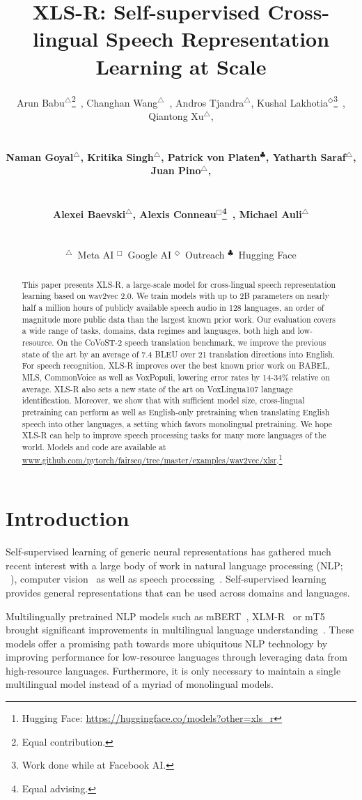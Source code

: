 \documentclass{article} \usepackage{iclr2022_conference,times}
\title{XLS-R: Self-supervised Cross-lingual Speech Representation Learning at Scale}
\author{\centerline{
Arun Babu$^{\bigtriangleup}$\thanks{Equal contribution.}~, 
Changhan Wang$^{\bigtriangleup}$\samethanks~,
Andros Tjandra$^{\bigtriangleup}$, 
Kushal Lakhotia$^{\Diamond}$\thanks{Work done while at Facebook AI.}~, 
Qiantong Xu$^{\bigtriangleup}$,} \vspace{1mm}\\
\centerline{\textbf{
Naman Goyal$^{\bigtriangleup}$,
Kritika Singh$^{\bigtriangleup}$, 
Patrick von Platen$^{\clubsuit}$, 
Yatharth Saraf$^{\bigtriangleup}$,
Juan Pino$^{\bigtriangleup}$,}}\vspace{1mm}\\
\centerline{\textbf{
Alexei Baevski$^{\bigtriangleup}$, 
Alexis Conneau$^{\Box}$\thanks{Equal advising.}~,
Michael Auli$^{\bigtriangleup}$\samethanks}}\vspace{1mm}\\
\centerline{\normalfont $^{\bigtriangleup}$~Meta AI\hspace{0.2in}
$^{\Box}$~Google AI\hspace{0.2in}
$^{\Diamond}$~Outreach\hspace{0.2in}
$^{\clubsuit}$~Hugging Face}
}
\newcommand{\xlsrp}{XLS-R}
\begin{document}
\maketitle

\begin{abstract}
This paper presents \xlsrp{}, a large-scale model for cross-lingual speech representation learning based on wav2vec 2.0. 
We train models with up to 2B parameters on nearly half a million hours of publicly available speech audio in 128 languages, an order of magnitude more public data than the largest known prior work.
Our evaluation covers a wide range of tasks, domains, data regimes and languages, both high and low-resource. 
On the CoVoST-2 speech translation benchmark, we improve the previous state of the art by an average of 7.4 BLEU over 21 translation directions into English.
For speech recognition, \xlsrp{} improves over the best known prior work on BABEL, MLS, CommonVoice as well as VoxPopuli, lowering error rates by 14-34\% relative on average.
\xlsrp{} also sets a new state of the art on VoxLingua107 language identification.
Moreover, we show that with sufficient model size, cross-lingual pretraining can perform as well as English-only pretraining when translating English speech into other languages, a setting which favors monolingual pretraining.
We hope \xlsrp{} can help to improve speech processing tasks for many more languages of the world. 
Models and code are available at {\small\url{www.github.com/pytorch/fairseq/tree/master/examples/wav2vec/xlsr}}.\footnote{Hugging Face: {\small \url{https://huggingface.co/models?other=xls_r}}}
\end{abstract}


\section{Introduction}
Self-supervised learning of generic neural representations has gathered much recent interest with a large body of work in natural language processing (NLP; ~\citealt{radford2018improving,baevski2019cloze,devlin2018bert,raffel2019exploring}), computer vision~\citep{chen2020simple,he2020momentum,caron2021emerging} as well as speech processing~\citep{oord2018cpc,schneider2019wav2vec,baevski2020wav,hsu2020hubert,chung2021w2vbert}. 
Self-supervised learning provides general representations that can be used across domains and languages. 

Multilingually pretrained NLP models such as mBERT~\citep{devlin2018bert}, XLM-R~\citep{conneau-etal-2020-unsupervised} or mT5~\citep{xue2020mt5} brought significant improvements in multilingual language understanding~\citep{conneau2018xnli,hu2020xtreme,ruder2021xtreme}.
These models offer a promising path towards more ubiquitous NLP technology by improving performance for low-resource languages through leveraging data from high-resource languages.
Furthermore, it is only necessary to maintain a single multilingual model instead of a myriad of monolingual models.
\end{document}
